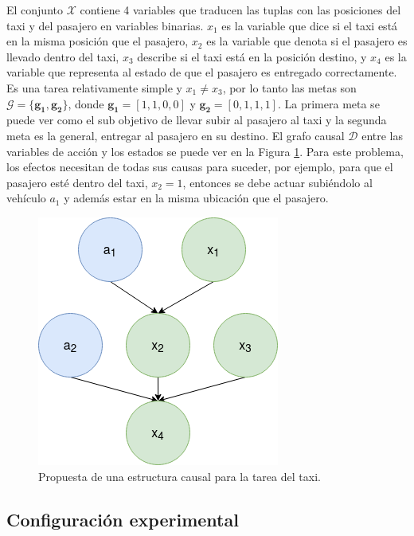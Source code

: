 El conjunto $\mathcal{X}$ contiene 4 variables que traducen las tuplas con las posiciones del taxi y del pasajero en variables binarias. $x_1$
es la variable que dice si el taxi está en la misma posición que el
pasajero, $x_2$ es la variable que denota si el pasajero es llevado dentro del taxi, $x_3$ describe si el taxi está en la posición destino,
y $x_4$ es la variable que representa al estado de que el pasajero es entregado correctamente. Es una tarea relativamente simple y $x_1 \neq x_3$, por lo tanto las metas son $\mathcal{G} = \{\mathbf{g_1}, \mathbf{g_2}\}$, donde $\mathbf{g_1} = [1, 1, 0 , 0]$ y $\mathbf{g_2} = [0,1,1,1]$. La primera meta se puede ver como el sub objetivo de 
llevar subir al pasajero al taxi y la segunda meta es la general, 
entregar al pasajero en su destino.
El grafo causal $\mathcal{D}$ entre las variables de acción y los estados se puede 
ver en la Figura \ref{fig:cm-taxi}. Para este problema, los efectos
necesitan de todas sus causas para suceder, por ejemplo, para que el
pasajero esté dentro del taxi, $x_2 = 1$, entonces se debe actuar
subiéndolo al vehículo $a_1$ y además estar en la misma ubicación que
el pasajero.

\begin{figure}[H]
    \centering
    \includegraphics[scale=0.3]{Chapter5/Figs/causal_structure_taxi.png}
    \caption{Propuesta de una estructura causal para la tarea del taxi.}
    \label{fig:cm-taxi}
\end{figure}


\subsection{Configuración experimental}

